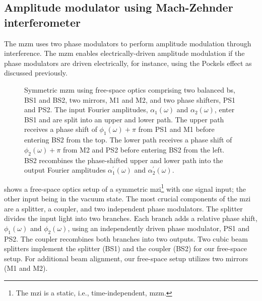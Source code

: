 \subsection{Amplitude modulator using Mach-Zehnder interferometer}

The \gls{mzm} uses two phase modulators to perform amplitude modulation through interference.
The \gls{mzm} enables electrically-driven amplitude modulation if the phase modulators are driven electrically, for instance, using the Pockels effect as discussed previously.
\begin{figure}[htb]
	\centering
	
	\caption{Symmetric \gls{mzm} using free-space optics comprising two balanced \gls{bs}, BS1 and BS2, two mirrors, M1 and M2, and two phase shifters, PS1 and PS2. The input Fourier amplitudes, $\alpha_1(\omega)$ and $\alpha_2(\omega)$, enter BS1 and are split into an upper and lower path. The upper path receives a phase shift of $\phi_1(\omega)+\pi$ from PS1 and M1 before entering BS2 from the top. The lower path receives a phase shift of $\phi_2(\omega)+\pi$ from M2 and PS2 before entering BS2 from the left. BS2 recombines the phase-shifted upper and lower path into the output Fourier amplitudes $\alpha_1^\prime(\omega)$ and $\alpha_2^\prime(\omega)$.}\label{fig:mzi_symmetric}
\end{figure}
 shows a free-space optics setup of a symmetric \gls{mzi}\footnote{The \gls{mzi} is a static, i.e., time-independent, \gls{mzm}.} with one signal input; the other input being in the vacuum state.
The most crucial components of the \gls{mzi} are a splitter, a coupler, and two independent phase modulators.
The splitter divides the input light into two branches.
Each branch adds a relative phase shift, $\phi_1(\omega)$ and $\phi_2(\omega)$, using an independently  driven phase modulator, PS1 and PS2.
The coupler recombines both branches into two outputs.
Two cubic beam splitters implement the splitter (BS1) and the coupler (BS2) for our free-space setup.
For additional beam alignment, our free-space setup utilizes two mirrors (M1 and M2).

